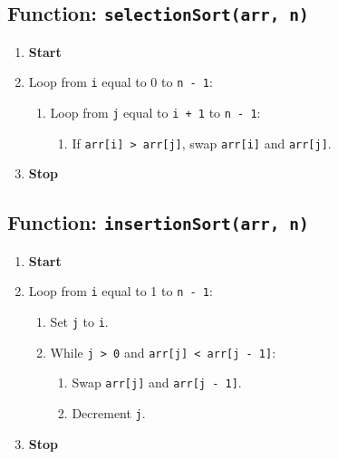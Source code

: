 {  \subsection{Function: \texttt{selectionSort(arr, n)}}
  \begin{enumerate}[label*=\arabic*.]
    \item \textbf{Start}
    \item Loop from \texttt{i} equal to 0 to \texttt{n - 1}:
          \begin{enumerate}[label*=\arabic*.]
            \item Loop from \texttt{j} equal to \texttt{i + 1} to \texttt{n - 1}:
                  \begin{enumerate}[label*=\arabic*.]
                    \item If \texttt{arr[i] > arr[j]}, swap \texttt{arr[i]} and \texttt{arr[j]}.
                  \end{enumerate}
          \end{enumerate}
    \item \textbf{Stop}
  \end{enumerate}

  \subsection{Function: \texttt{insertionSort(arr, n)}}
  \begin{enumerate}[label*=\arabic*.]
    \item \textbf{Start}
    \item Loop from \texttt{i} equal to 1 to \texttt{n - 1}:
          \begin{enumerate}[label*=\arabic*.]
            \item Set \texttt{j} to \texttt{i}.
            \item While \texttt{j > 0} and \texttt{arr[j] < arr[j - 1]}:
                  \begin{enumerate}[label*=\arabic*.]
                    \item Swap \texttt{arr[j]} and \texttt{arr[j - 1]}.
                    \item Decrement \texttt{j}.
                  \end{enumerate}
          \end{enumerate}
    \item \textbf{Stop}
  \end{enumerate}

}
